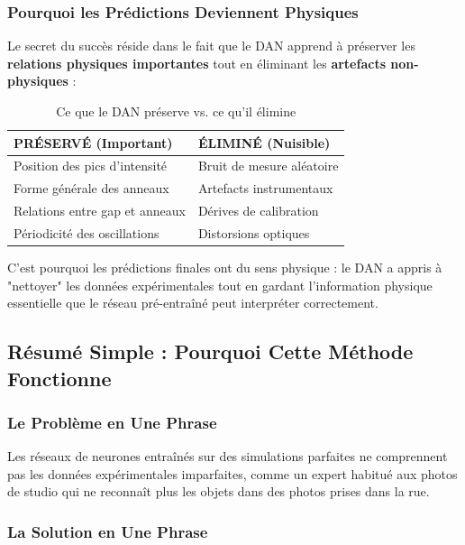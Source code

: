 \documentclass[twocolumn,10pt]{article}
\begin{document}
\subsubsection{Pourquoi les Prédictions Deviennent Physiques}

Le secret du succès réside dans le fait que le DAN apprend à préserver les \textbf{relations physiques importantes} tout en éliminant les \textbf{artefacts non-physiques} :

\begin{table}[H]
\centering
\caption{Ce que le DAN préserve vs. ce qu'il élimine}
\begin{tabular}{|l|l|}
\hline
\textbf{PRÉSERVÉ (Important)} & \textbf{ÉLIMINÉ (Nuisible)} \\
\hline
Position des pics d'intensité & Bruit de mesure aléatoire \\
Forme générale des anneaux & Artefacts instrumentaux \\
Relations entre gap et anneaux & Dérives de calibration \\
Périodicité des oscillations & Distorsions optiques \\
\hline
\end{tabular}
\end{table}

C'est pourquoi les prédictions finales ont du sens physique : le DAN a appris à "nettoyer" les données expérimentales tout en gardant l'information physique essentielle que le réseau pré-entraîné peut interpréter correctement.

\subsection{Résumé Simple : Pourquoi Cette Méthode Fonctionne}

\subsubsection{Le Problème en Une Phrase}

Les réseaux de neurones entraînés sur des simulations parfaites ne comprennent pas les données expérimentales imparfaites, comme un expert habitué aux photos de studio qui ne reconnaît plus les objets dans des photos prises dans la rue.

\subsubsection{La Solution en Une Phrase}
\end{document}
